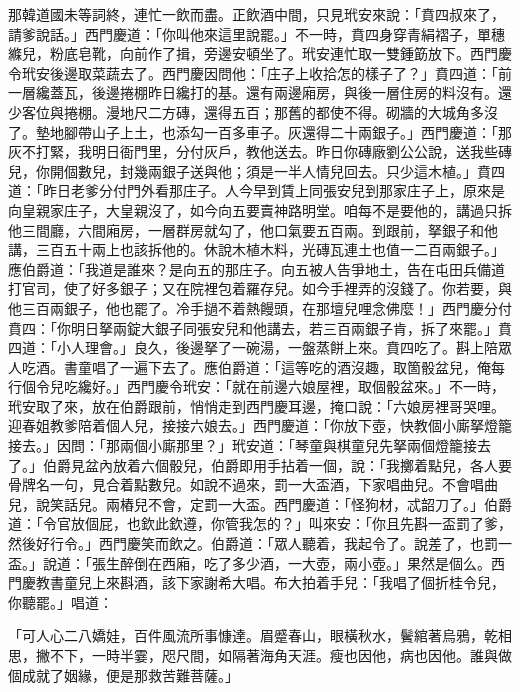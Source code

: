 \begin{showcontents}{}
那韓道國未等詞終，連忙一飲而盡。正飲酒中間，只見玳安來說：「賁四叔來了，請爹說話。」西門慶道：「你叫他來這里說罷。」不一時，賁四身穿青絹褶子，單穗縧兒，粉底皂靴，向前作了揖，旁邊安頓坐了。玳安連忙取一雙鍾筯放下。西門慶令玳安後邊取菜蔬去了。西門慶因問他：「庄子上收拾怎的樣子了？」賁四道：「前一層纔蓋瓦，後邊捲棚昨日纔打的基。還有兩邊廂房，與後一層住房的料沒有。還少客位與捲棚。漫地尺二方磚，還得五百；那舊的都使不得。砌牆的大城角多沒了。墊地腳帶山子上土，也添勾一百多車子。灰還得二十兩銀子。」西門慶道：「那灰不打緊，我明日衙門里，分付灰戶，教他送去。昨日你磚廠劉公公說，送我些磚兒，你開個數兒，封幾兩銀子送與他；須是一半人情兒回去。只少這木植。」賁四道：「昨日老爹分付門外看那庄子。人今早到賃上同張安兒到那家庄子上，原來是向皇親家庄子，大皇親沒了，如今向五要賣神路明堂。咱每不是要他的，講過只拆他三間廳，六間廂房，一層群房就勾了，他口氣要五百兩。到跟前，拏銀子和他講，三百五十兩上也該拆他的。休說木植木料，光磚瓦連土也值一二百兩銀子。」應伯爵道：「我道是誰來？是向五的那庄子。向五被人告爭地土，告在屯田兵備道打官司，使了好多銀子；又在院裡包着羅存兒。如今手裡弄的沒錢了。你若要，與他三百兩銀子，他也罷了。冷手撾不着熱饅頭，在那壇兒哩念佛麼！」西門慶分付賁四：「你明日拏兩錠大銀子同張安兒和他講去，若三百兩銀子肯，拆了來罷。」賁四道：「小人理會。」良久，後邊拏了一碗湯，一盤蒸餅上來。賁四吃了。斟上陪眾人吃酒。書童唱了一遍下去了。應伯爵道：「這等吃的酒沒趣，取箇骰盆兒，俺每行個令兒吃纔好。」西門慶令玳安：「就在前邊六娘屋裡，取個骰盆來。」不一時，玳安取了來，放在伯爵跟前，悄悄走到西門慶耳邊，掩口說：「六娘房裡哥哭哩。迎春姐教爹陪着個人兒，接接六娘去。」西門慶道：「你放下壺，快教個小廝拏燈籠接去。」因問：「那兩個小廝那里？」玳安道：「琴童與棋童兒先拏兩個燈籠接去了。」伯爵見盆內放着六個骰兒，伯爵即用手拈着一個，說：「我擲着點兒，各人要骨牌名一句，見合着點數兒。如說不過來，罰一大盃酒，下家唱曲兒。不會唱曲兒，說笑話兒。兩樁兒不會，定罰一大盃。西門慶道：「怪狗材，忒韶刀了。」伯爵道：「令官放個屁，也欽此欽遵，你管我怎的？」叫來安：「你且先斟一盃罰了爹，然後好行令。」西門慶笑而飲之。伯爵道：「眾人聽着，我起令了。說差了，也罰一盃。」說道：「張生醉倒在西廂，吃了多少酒，一大壺，兩小壺。」果然是個么。西門慶教書童兒上來斟酒，該下家謝希大唱。布大拍着手兒：「我唱了個折桂令兒，你聽罷。」唱道：

「可人心二八嬌娃，百件風流所事慷達。眉蹙春山，眼橫秋水，鬢綰著烏鴉，乾相思，撇不下，一時半霎，咫尺間，如隔著海角天涯。瘦也因他，病也因他。誰與做個成就了姻緣，便是那救苦難菩薩。」


\end{showcontents}
